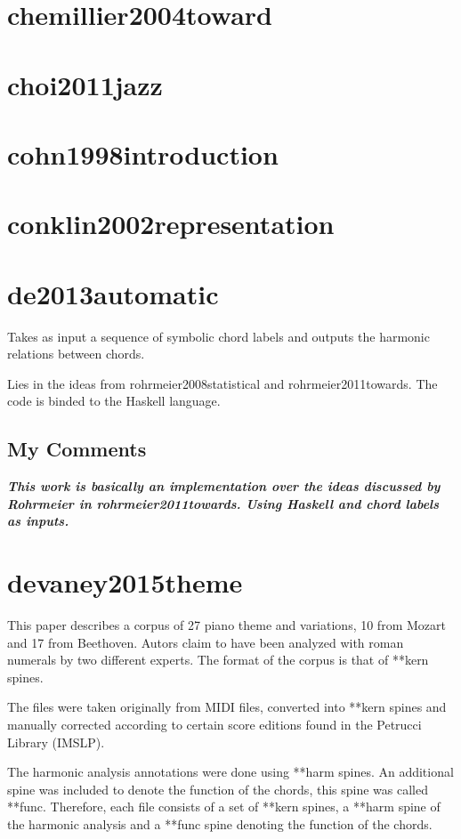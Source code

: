 	\section{chemillier2004toward }
	\section{choi2011jazz }
	\section{cohn1998introduction }
	\section{conklin2002representation }
	\section{de2013automatic }
		Takes as input a sequence of symbolic chord labels and outputs the harmonic relations between chords.

		Lies in the ideas from rohrmeier2008statistical and rohrmeier2011towards. The code is binded to the Haskell language.

		\subsection{My Comments}
			\emph{\textbf{
				This work is basically an implementation over the ideas discussed by Rohrmeier in rohrmeier2011towards. Using Haskell and chord labels as inputs.
			}}
	\section{devaney2015theme }
		This paper describes a corpus of 27 piano theme and variations, 10 from Mozart and 17 from Beethoven. Autors claim to have been analyzed with roman numerals by two different experts. The format of the corpus is that of **kern spines.

		The files were taken originally from MIDI files, converted into **kern spines and manually corrected according to certain score editions found in the Petrucci Library (IMSLP).

		The harmonic analysis annotations were done using  **harm spines. An additional spine was included to denote the function of the chords, this spine was called **func. Therefore, each file consists of a set of **kern spines, a **harm spine of the harmonic analysis and a **func spine denoting the function of the chords.

